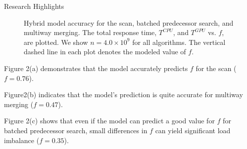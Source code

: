 \documentclass[final]{beamer}
\newlength{\colwidth}
\begin{document}
\begin{frame}[t]
\begin{columns}[t]
\begin{column}{\colwidth}
  \begin{block}{Research Highlights}
\begin{figure}[htp]
\centering
{}

 \caption{Hybrid model accuracy for the scan, batched predecessor search, and multiway merging. The total response time, $T^{CPU}$, and $T^{GPU}$ vs. $f$, are plotted. We show $n=4.0\times10^9$ for all algorithms. The vertical dashed line in each plot denotes the modeled value of $f$.}

 \label{fig:time_vs_f}
\end{figure}

\begin{description}[font=$\bullet$~\normalfont\scshape\color{red!50!black}]
\item Figure 2(a) demonstrates that the model accurately predicts $f$ for the scan ($f=0.76$).
\item  Figure2(b) indicates that the model's prediction is quite accurate for multiway merging ($f=0.47$).
\item  Figure 2(c) shows that even if the model can predict a good value for $f$ for batched predecessor search, small differences in $f$ can yield significant load imbalance ($f=0.35$). 
\end{description}


\end{block}
\end{column}
\end{columns}
\end{frame}
\end{document}
